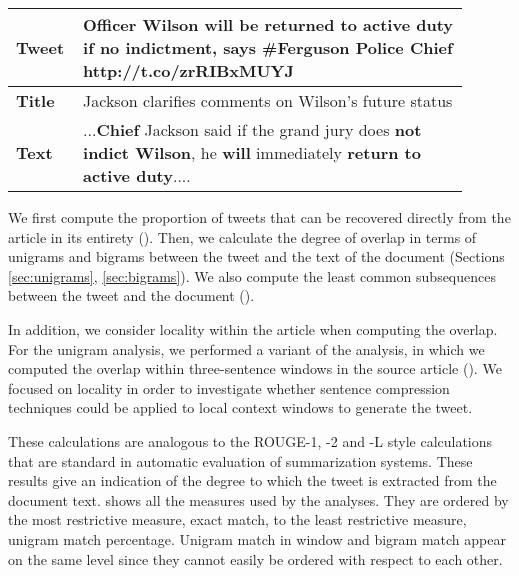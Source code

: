\begin{table}[!t]
\centering
\begin{tabular}{|p{0.1\linewidth}|p{0.8\linewidth}|}
\hline
\textbf{Tweet} & Officer \textbf{Wilson will be returned to active duty if no indictment}, says \#Ferguson Police \textbf{Chief} http://t.co/zrRIBxMUYJ  \\ \hline
\textbf{Title} & Jackson clarifies comments on Wilson's future status \\ \hline
\textbf{Text}  & ...\textbf{Chief} Jackson said if the grand jury does \textbf{not indict Wilson}, he \textbf{will} immediately \textbf{return to active duty}.... \\ \hline
\end{tabular}
\label{tab:extract}
\end{table}

We first compute the proportion of tweets that can be recovered directly from the article in its entirety (). Then, we calculate the degree of overlap in terms of unigrams and bigrams between the tweet and the text of the document (Sections \ref{sec:unigrams}, \ref{sec:bigrams}). We also compute the least common subsequences between the tweet and the document ().

In addition, we consider locality within the article when computing the overlap. For the unigram analysis, we performed a variant of the analysis, in which we computed the overlap within three-sentence windows in the source article (). We focused on locality in order to  investigate whether sentence compression techniques could be applied to local context windows to generate the tweet.

These calculations are analogous to the ROUGE-1, -2 and -L style calculations that are standard in automatic evaluation of summarization systems. These results give an indication of the degree to which the tweet is extracted from the document text.  shows all the measures used by the analyses. They are ordered by the most restrictive measure, exact match, to the least restrictive measure, unigram match percentage. Unigram match in window and bigram match appear on the same level since they cannot easily be ordered with respect to each other.

